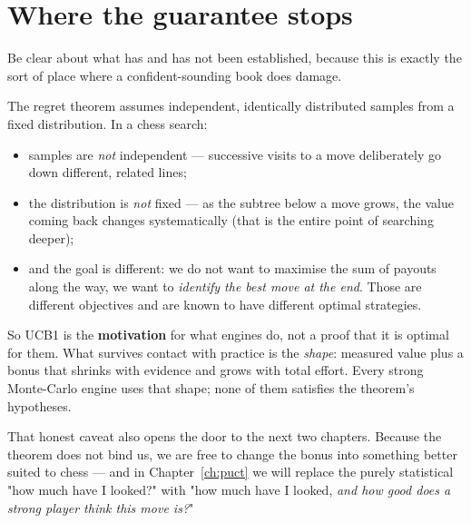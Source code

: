 \section{Where the guarantee stops}

Be clear about what has and has not been established, because this is exactly the sort of
place where a confident-sounding book does damage.

\begin{pitfall}
The regret theorem assumes independent, identically distributed samples from a fixed
distribution. In a chess search:
\begin{itemize}
\item samples are \emph{not} independent --- successive visits to a move deliberately go
  down different, related lines;
\item the distribution is \emph{not} fixed --- as the subtree below a move grows, the value
  coming back changes systematically (that is the entire point of searching deeper);
\item and the goal is different: we do not want to maximise the sum of payouts along the
  way, we want to \emph{identify the best move at the end}. Those are different objectives
  and are known to have different optimal strategies.
\end{itemize}
So UCB1 is the \textbf{motivation} for what engines do, not a proof that it is optimal for
them. What survives contact with practice is the \emph{shape}: measured value plus a bonus
that shrinks with evidence and grows with total effort. Every strong Monte-Carlo engine uses
that shape; none of them satisfies the theorem's hypotheses.
\end{pitfall}

That honest caveat also opens the door to the next two chapters. Because the theorem does not
bind us, we are free to change the bonus into something better suited to chess --- and in
Chapter~\ref{ch:puct} we will replace the purely statistical "how much have I looked?" with
"how much have I looked, \emph{and how good does a strong player think this move is?}"

